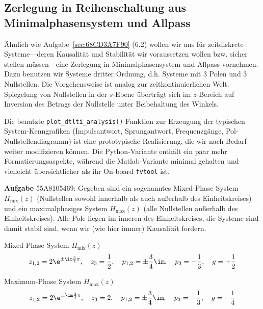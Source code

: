 \subsection{Zerlegung in Reihenschaltung aus Minimalphasensystem und Allpass}
\label{sec:55A8105469}
\begin{Ziel}
Ähnlich wie Aufgabe~\ref{sec:68CD3A7F90} (6.2) wollen wir uns für zeitdiskrete Systeme---deren
Kausalität und Stabilität wir voraussetzen wollen bzw. sicher stellen müssen---eine
Zerlegung in Minimalphasensystem und Allpass vornehmen. Dazu benutzen
wir Systeme dritter Ordnung, d.h. Systeme
mit 3 Polen und 3 Nullstellen. Die Vorgehensweise
ist analog zur zeitkontinuierlichen Welt. Spiegelung von Nullstellen in
der $s$-Ebene überträgt sich im $z$-Bereich auf
Inversion des Betrags der Nullstelle unter Beibehaltung des
Winkels.
%

Die benutzte \texttt{plot\_dtlti\_analysis()} Funktion zur Erzeugung der
typischen System-Kenngrafiken (Impulsantwort, Sprungantwort, Frequenzgänge,
Pol-Nullstellendiagramm) ist eine prototypische
Realisierung, die wir nach Bedarf weiter modifizieren können. Die Python-Variante
enthält ein paar mehr Formatierungsaspekte, während die Matlab-Variante
minimal gehalten und vielleicht übersichtlicher als ihr On-board
\texttt{fvtool} ist.
%
\end{Ziel}
\textbf{Aufgabe} {\tiny 55A8105469}:
Gegeben sind ein sogenanntes Mixed-Phase System $H_\mathrm{mix}(z)$
(Nullstellen sowohl innerhalb als auch außerhalb des
Einheitskreises) und ein maximalphasiges System $H_\mathrm{max}(z)$
(alle Nullstellen außerhalb des Einheitskreises). Alle Pole liegen im inneren
des Einheitskreises, die Systeme sind damit stabil sind, wenn wir (wie hier immer)
Kausalität fordern.

Mixed-Phase System $H_\mathrm{mix}(z)$
\begin{align}
z_{1,2} = 2 \e^{\pm\im\frac{3}{4}\pi},\quad z_3 = \frac{1}{2},\quad
p_{1,2} = \pm\frac{3}{4}\im,\quad p_3 = -\frac{1}{3},\quad
g = + \frac{1}{2}
\end{align}

Maximum-Phase System $H_\mathrm{max}(z)$
\begin{align}
z_{1,2} = 2 \e^{\pm\im\frac{3}{4}\pi},\quad z_3 = 2,\quad
p_{1,2} = \pm\frac{3}{4}\im,\quad p_3 = -\frac{1}{3},\quad
g = - \frac{1}{4}
\end{align}

